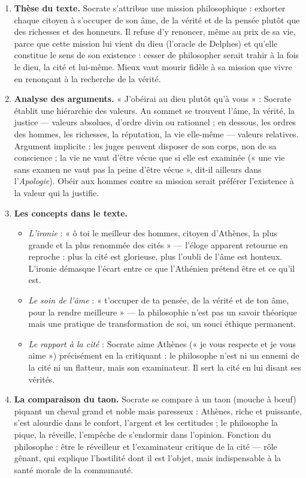 \documentclass[11pt]{article}
\begin{document}
\begin{corrige}
\begin{enumerate}
\item \textbf{Thèse du texte.} Socrate s'attribue une mission philosophique : exhorter chaque citoyen à s'occuper de son âme, de la vérité et de la pensée plutôt que des richesses et des honneurs. Il refuse d'y renoncer, même au prix de sa vie, parce que cette mission lui vient du dieu (l'oracle de Delphes) et qu'elle constitue le sens de son existence : cesser de philosopher serait trahir à la fois le dieu, la cité et lui-même. Mieux vaut mourir fidèle à sa mission que vivre en renonçant à la recherche de la vérité.
\item \textbf{Analyse des arguments.} « J'obéirai au dieu plutôt qu'à vous » : Socrate établit une hiérarchie des valeurs. Au sommet se trouvent l'âme, la vérité, la justice — valeurs absolues, d'ordre divin ou rationnel ; en dessous, les ordres des hommes, les richesses, la réputation, la vie elle-même — valeurs relatives. Argument implicite : les juges peuvent disposer de son corps, non de sa conscience ; la vie ne vaut d'être vécue que si elle est examinée (« une vie sans examen ne vaut pas la peine d'être vécue », dit-il ailleurs dans l'\emph{Apologie}). Obéir aux hommes contre sa mission serait préférer l'existence à la valeur qui la justifie.
\item \textbf{Les concepts dans le texte.}
\begin{itemize}
\item \emph{L'ironie} : « ô toi le meilleur des hommes, citoyen d'Athènes, la plus grande et la plus renommée des cités » — l'éloge apparent retourne en reproche : plus la cité est glorieuse, plus l'oubli de l'âme est honteux. L'ironie démasque l'écart entre ce que l'Athénien prétend être et ce qu'il est.
\item \emph{Le soin de l'âme} : « t'occuper de ta pensée, de la vérité et de ton âme, pour la rendre meilleure » — la philosophie n'est pas un savoir théorique mais une pratique de transformation de soi, un souci éthique permanent.
\item \emph{Le rapport à la cité} : Socrate aime Athènes (« je vous respecte et je vous aime ») précisément en la critiquant : le philosophe n'est ni un ennemi de la cité ni un flatteur, mais son examinateur. Il sert la cité en lui disant ses vérités.
\end{itemize}
\item \textbf{La comparaison du taon.} Socrate se compare à un taon (mouche à bœuf) piquant un cheval grand et noble mais paresseux : Athènes, riche et puissante, s'est alourdie dans le confort, l'argent et les certitudes ; le philosophe la pique, la réveille, l'empêche de s'endormir dans l'opinion. Fonction du philosophe : être le réveilleur et l'examinateur critique de la cité — rôle gênant, qui explique l'hostilité dont il est l'objet, mais indispensable à la santé morale de la communauté.

\end{enumerate}
\end{corrige}
\end{document}
